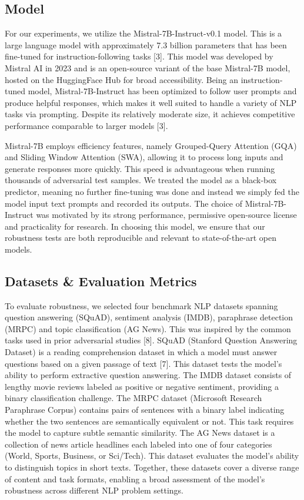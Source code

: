 \documentclass[conference]{IEEEtran}
\begin{document}
\subsection{Model}

For our experiments, we utilize the Mistral-7B-Instruct-v0.1 model. This is a large language model with approximately 7.3 billion parameters that has been fine-tuned for instruction-following tasks [3]. This model was developed by Mistral AI in 2023 and is an open-source variant of the base Mistral-7B model, hosted on the HuggingFace Hub for broad accessibility. Being an instruction-tuned model, Mistral-7B-Instruct has been optimized to follow user prompts and produce helpful responses, which makes it well suited to handle a variety of NLP tasks via prompting. Despite its relatively moderate size, it achieves competitive performance comparable to larger models [3].

Mistral-7B employs efficiency features, namely Grouped-Query Attention (GQA) and Sliding Window Attention (SWA), allowing it to process long inputs and generate responses more quickly. This speed is advantageous when running thousands of adversarial test samples. We treated the model as a black-box predictor, meaning no further fine-tuning was done and instead we simply fed the model input text prompts and recorded its outputs. The choice of Mistral-7B-Instruct was motivated by its strong performance, permissive open-source license and practicality for research. In choosing this model, we ensure that our robustness tests are both reproducible and relevant to state-of-the-art open models.

\subsection{Datasets \& Evaluation Metrics}

To evaluate robustness, we selected four benchmark NLP datasets spanning question answering (SQuAD), sentiment analysis (IMDB), paraphrase detection (MRPC) and topic classification (AG News). This was inspired by the common tasks used in prior adversarial studies [8]. SQuAD (Stanford Question Answering Dataset) is a reading comprehension dataset in which a model must answer questions based on a given passage of text [7]. This dataset tests the model’s ability to perform extractive question answering. The IMDB dataset consists of lengthy movie reviews labeled as positive or negative sentiment, providing a binary classification challenge. The MRPC dataset (Microsoft Research Paraphrase Corpus) contains pairs of sentences with a binary label indicating whether the two sentences are semantically equivalent or not. This task requires the model to capture subtle semantic similarity. The AG News dataset is a collection of news article headlines each labeled into one of four categories (World, Sports, Business, or Sci/Tech). This dataset evaluates the model’s ability to distinguish topics in short texts. Together, these datasets cover a diverse range of content and task formats, enabling a broad assessment of the model’s robustness across different NLP problem settings.
\end{document}
